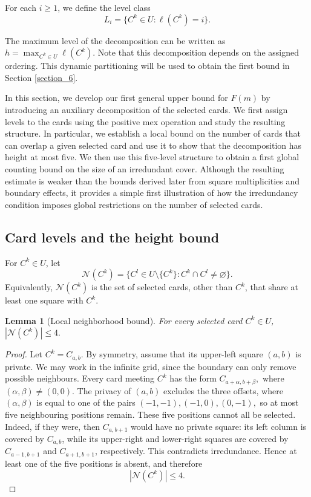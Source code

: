 \documentclass[11pt]{article}
\newtheorem{lemma}[theorem]{Lemma}
\begin{document}
	For each \(i\ge1\), we define the level class
	\[
	L_i=\{C^k\in U:\ell(C^k)=i\}.
	\]
	
	
	
	The maximum level of the decomposition can be written as $
	h=\displaystyle \max_{C^k\in U}\ell(C^k).$
	Note that this decomposition depends on the assigned ordering. This dynamic partitioning will be used to obtain the first bound in Section \ref{section_6}.
	
	In this section, we develop our first general upper bound for \(F(m)\) by introducing an auxiliary decomposition of the selected cards. We first assign levels to the cards using the positive mex operation and study the resulting structure. In particular, we establish a local bound on the number of cards that can overlap a given selected card and use it to show that the decomposition has height at most five. We then use this five-level structure to obtain a first global counting bound on the size of an irredundant cover. Although the resulting estimate is weaker than the bounds derived later from square multiplicities and boundary effects, it provides a simple first illustration of how the irredundancy condition imposes global restrictions on the number of selected cards.
	
	\subsection{Card levels and the height bound}
	
	For \(C^k\in U\), let
	\[
	\mathcal N(C^k)=\{C^l\in U\setminus\{C^k\}: C^k\cap C^l\neq\varnothing\}.
	\]
	Equivalently, $\mathcal N(C^k)$ is the set of selected cards, other than $C^k$, that share at least one square with $C^k$.
	
	
	\begin{lemma}[Local neighborhood bound]
		For every selected card \(C^k\in U\), $|\mathcal N(C^k)|\le 4.$
		\label{Local neighborhood bound}
	\end{lemma}
	
	\begin{proof}
		Let \(C^k=C_{a,b}\). By symmetry, assume that its upper-left square
		\((a,b)\) is private. We may work in the infinite grid, since the boundary can
		only remove possible neighbours. Every card meeting \(C^k\) has the form $C_{a+\alpha,b+\beta},$ where $(\alpha,\beta)\neq (0,0).$
		The privacy of \((a,b)\) excludes the three offsets, where $(\alpha,\beta)$ is equal to one of the pairs $(-1,-1), (-1,0), (0,-1),$ so at most five neighbouring positions remain. These five positions cannot all be selected. Indeed, if they were, then
		\(C_{a,b+1}\) would have no private square: its left column is covered by
		\(C_{a,b}\), while its upper-right and lower-right squares are covered by
		\(C_{a-1,b+1}\) and \(C_{a+1,b+1}\), respectively. This contradicts
		irredundance. Hence at least one of the five positions is absent, and therefore
		\[
		|\mathcal N(C^k)|\le 4.
		\]
	\end{proof}
	
\end{document}
